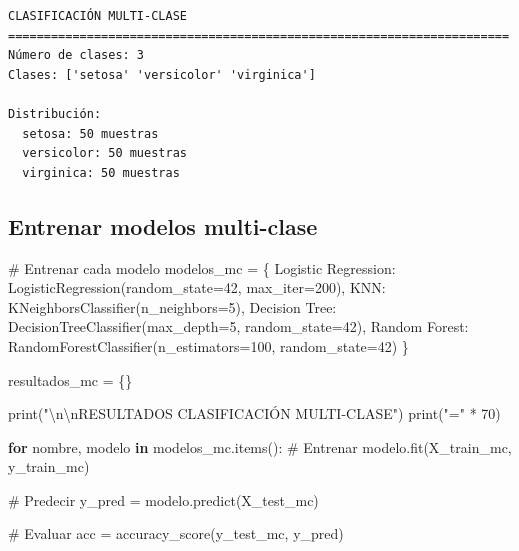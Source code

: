 \documentclass[
  doc,
  floatsintext,
  longtable,
  a4paper,
  nolmodern,
  notxfonts,
  notimes,
  12pt,
  colorlinks=true,linkcolor=blue,citecolor=blue,urlcolor=blue]{apa7}
\newenvironment{Shaded}{\begin{snugshade}}{\end{snugshade}}
\newcommand{\BuiltInTok}[1]{\textcolor[rgb]{0.00,0.23,0.31}{#1}}
\newcommand{\CharTok}[1]{\textcolor[rgb]{0.13,0.47,0.30}{#1}}
\newcommand{\CommentTok}[1]{\textcolor[rgb]{0.37,0.37,0.37}{#1}}
\newcommand{\ControlFlowTok}[1]{\textcolor[rgb]{0.00,0.23,0.31}{\textbf{#1}}}
\newcommand{\DecValTok}[1]{\textcolor[rgb]{0.68,0.00,0.00}{#1}}
\newcommand{\KeywordTok}[1]{\textcolor[rgb]{0.00,0.23,0.31}{\textbf{#1}}}
\newcommand{\NormalTok}[1]{\textcolor[rgb]{0.00,0.23,0.31}{#1}}
\newcommand{\OperatorTok}[1]{\textcolor[rgb]{0.37,0.37,0.37}{#1}}
\newcommand{\StringTok}[1]{\textcolor[rgb]{0.13,0.47,0.30}{#1}}
\begin{document}
\begin{verbatim}
CLASIFICACIÓN MULTI-CLASE
======================================================================
Número de clases: 3
Clases: ['setosa' 'versicolor' 'virginica']

Distribución:
  setosa: 50 muestras
  versicolor: 50 muestras
  virginica: 50 muestras
\end{verbatim}

\subsection{Entrenar modelos
multi-clase}\label{entrenar-modelos-multi-clase}

\begin{Shaded}
\begin{Highlighting}[]
\CommentTok{\# Entrenar cada modelo}
\NormalTok{modelos\_mc }\OperatorTok{=}\NormalTok{ \{}
    \StringTok{\textquotesingle{}Logistic Regression\textquotesingle{}}\NormalTok{: LogisticRegression(random\_state}\OperatorTok{=}\DecValTok{42}\NormalTok{, max\_iter}\OperatorTok{=}\DecValTok{200}\NormalTok{),}
    \StringTok{\textquotesingle{}KNN\textquotesingle{}}\NormalTok{: KNeighborsClassifier(n\_neighbors}\OperatorTok{=}\DecValTok{5}\NormalTok{),}
    \StringTok{\textquotesingle{}Decision Tree\textquotesingle{}}\NormalTok{: DecisionTreeClassifier(max\_depth}\OperatorTok{=}\DecValTok{5}\NormalTok{, random\_state}\OperatorTok{=}\DecValTok{42}\NormalTok{),}
    \StringTok{\textquotesingle{}Random Forest\textquotesingle{}}\NormalTok{: RandomForestClassifier(n\_estimators}\OperatorTok{=}\DecValTok{100}\NormalTok{, random\_state}\OperatorTok{=}\DecValTok{42}\NormalTok{)}
\NormalTok{\}}

\NormalTok{resultados\_mc }\OperatorTok{=}\NormalTok{ \{\}}

\BuiltInTok{print}\NormalTok{(}\StringTok{"}\CharTok{\textbackslash{}n\textbackslash{}n}\StringTok{RESULTADOS CLASIFICACIÓN MULTI{-}CLASE"}\NormalTok{)}
\BuiltInTok{print}\NormalTok{(}\StringTok{"="} \OperatorTok{*} \DecValTok{70}\NormalTok{)}

\ControlFlowTok{for}\NormalTok{ nombre, modelo }\KeywordTok{in}\NormalTok{ modelos\_mc.items():}
    \CommentTok{\# Entrenar}
\NormalTok{    modelo.fit(X\_train\_mc, y\_train\_mc)}
    
    \CommentTok{\# Predecir}
\NormalTok{    y\_pred }\OperatorTok{=}\NormalTok{ modelo.predict(X\_test\_mc)}
    
    \CommentTok{\# Evaluar}
\NormalTok{    acc }\OperatorTok{=}\NormalTok{ accuracy\_score(y\_test\_mc, y\_pred)}
    

\end{Highlighting}
\end{Shaded}
\end{document}
